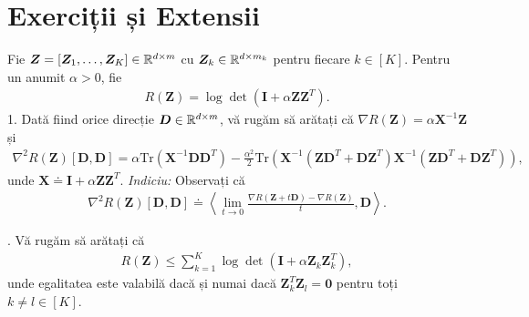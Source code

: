 \documentclass[../../book-main_ro.tex]{subfiles}
\begin{document}
\section{Exerciții și Extensii}


\begin{exercise}
    Fie $\bm Z = [\bm Z_1,\dots,\bm Z_K] \in \mathbb{R}^{d\times m}$ cu $\bm Z_k \in \mathbb{R}^{d\times m_k}$ pentru fiecare $k \in [K]$. Pentru un anumit $\alpha > 0$, fie
    \begin{align*}
        R(\bm Z) = \log\det\left(\bm I + \alpha\bm Z\bm Z^T \right).
    \end{align*}
1. Dată fiind orice direcție $\bm D \in \mathbb{R}^{d\times m}$, vă rugăm să arătați că $\nabla R(\bm Z) = \alpha\bm X^{-1}\bm Z$ și
    \begin{align*}
 \nabla^2 R(\bm Z)[\bm D, \bm D] =\alpha \mathrm{Tr}\left( \bm X^{-1}\bm D\bm D^T\right) - \frac{\alpha^2}{2}\mathrm{Tr}\left(\bm X^{-1}\left( \bm Z\bm D^T+\bm D\bm Z^T\right) \bm X^{-1}\left( \bm Z\bm D^T+\bm D\bm Z^T\right)\right),
    \end{align*}
    unde $\bm X \doteq \bm I + \alpha\bm Z\bm Z^T$. {\em Indiciu:} Observați că
    \begin{align*}
        \nabla^2 R(\bm Z)[\bm D, \bm D] \doteq \left\langle \lim_{t \to 0} \frac{\nabla R(\bm Z+ t\bm D) - \nabla R(\bm Z)}{t}, \bm D \right\rangle. 
    \end{align*}

. Vă rugăm să arătați că
\begin{align*}
    R(\bm Z) \le \sum_{k=1}^K \log\det\left(\bm I + \alpha\bm Z_k\bm Z_k^T \right),
\end{align*}
unde egalitatea este valabilă dacă și numai dacă $\bm Z_k^T\bm Z_l = \bm 0$ pentru toți $k \neq l \in [K]$.
\medskip 


\end{exercise}
\end{document}
